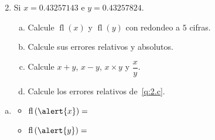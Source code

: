 \begin{frame}

	\begin{enumerate}\setcounter{enumi}{1}
		\item

		      Si $x=0.43257143$ e $y=0.43257824$.
		      \begin{multicols}{2}
			      \begin{enumerate}[a)]
				      \item\label{q:2.a}

				      Calcule
				      \begin{math}
					      \operatorname{fl}\left(x\right)
				      \end{math}
				      y
				      \begin{math}
					      \operatorname{fl}\left(y\right)
				      \end{math}
				      con redondeo a $5$ cifras.

				      \item\label{q:2.b}

				      Calcule sus errores relativos y absolutos.

				      \item\label{q:2.c}

				      Calcule $x+y$, $x-y$, $x\times y$ y $\dfrac{x}{y}$.

				      \item\label{q:2.d}

				      Calcule los errores relativos de~\eqref{q:2.c}.
			      \end{enumerate}
		      \end{multicols}
	\end{enumerate}
	\begin{solution}
		\begin{enumerate}[a)]
			\item

			      \begin{multicols}{2}
				      \begin{itemize}
					      \item

					            \begin{math}
						            \operatorname{fl}\left(\alert{x}\right)=
					            \end{math}

					      \item

					            \begin{math}
						            \operatorname{fl}\left(\alert{y}\right)=
					            \end{math}
				      \end{itemize}
			      \end{multicols}




\end{enumerate}
\end{solution}
\end{frame}
